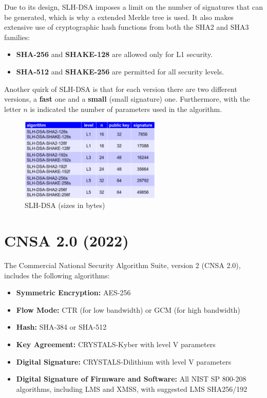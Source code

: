 Due to its design, SLH-DSA imposes a limit on the number of signatures
that can be generated, which is why a extended Merkle tree is used. It
also makes extensive use of cryptographic hash functions from both the
SHA2 and SHA3 families:  
\begin{itemize}
  \item \textbf{SHA-256} and \textbf{SHAKE-128} are allowed only for
    L1 security.  
  \item \textbf{SHA-512} and \textbf{SHAKE-256} are permitted for all
    security levels.  
\end{itemize}

Another quirk of SLH-DSA is that for each version there are two 
different versions, a \textbf{fast} one and a \textbf{small} (small
signature) one. Furthermore, with the letter $n$ is indicated the 
number of parameters used in the algorithm.

\begin{figure}[H]
  \centering
  \includegraphics[width=0.6\textwidth]{img/slhdsa.png}
  \caption{SLH-DSA (sizes in bytes)}
\end{figure}

\section{CNSA 2.0 (2022)}

The Commercial National Security Algorithm Suite, version 2 (CNSA 2.0), 
includes the following algorithms: 

\begin{itemize}
  \item \textbf{Symmetric Encryption:} AES-256
  \item \textbf{Flow Mode:} CTR (for low bandwidth) or GCM (for high
    bandwidth)
  \item \textbf{Hash:} SHA-384 or SHA-512
  \item \textbf{Key Agreement:} CRYSTALS-Kyber with level V
    parameters
  \item \textbf{Digital Signature:} CRYSTALS-Dilithium with level V
    parameters
  \item \textbf{Digital Signature of Firmware and Software:} 
    All NIST SP 800-208 algorithms, including LMS and XMSS, 
    with suggested LMS SHA256/192
\end{itemize}

